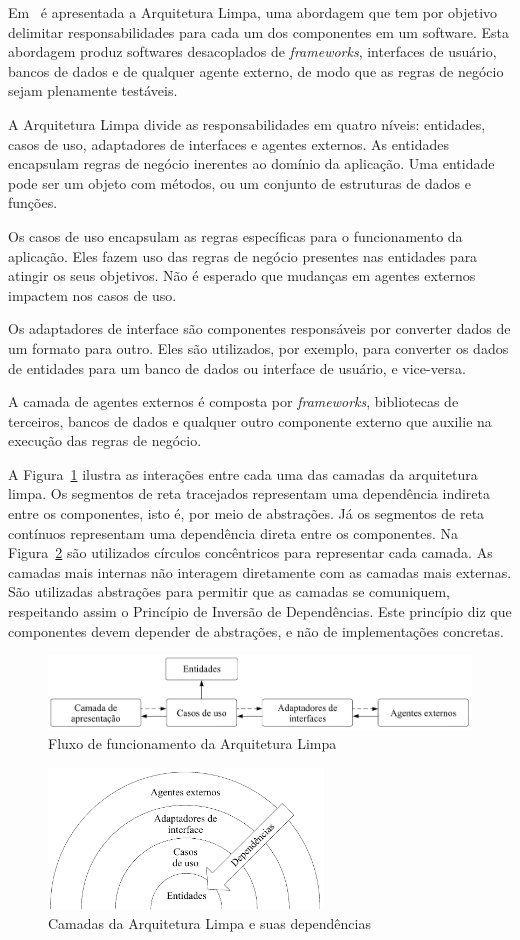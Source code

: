 Em~\cite{clean-arch-book} é apresentada a Arquitetura Limpa, uma abordagem que tem por objetivo delimitar responsabilidades para cada um dos componentes em um software.
Esta abordagem produz softwares desacoplados de \emph{frameworks}, interfaces de usuário, bancos de dados e de qualquer agente externo, de modo que as regras de negócio sejam plenamente testáveis.

A Arquitetura Limpa divide as responsabilidades em quatro níveis: entidades, casos de uso, adaptadores de interfaces e agentes externos.
As entidades encapsulam regras de negócio inerentes ao domínio da aplicação.
Uma entidade pode ser um objeto com métodos, ou um conjunto de estruturas de dados e funções.

Os casos de uso encapsulam as regras específicas para o funcionamento da aplicação.
Eles fazem uso das regras de negócio presentes nas entidades para atingir os seus objetivos.
Não é esperado que mudanças em agentes externos impactem nos casos de uso.

Os adaptadores de interface são componentes responsáveis por converter dados de um formato para outro.
Eles são utilizados, por exemplo, para converter os dados de entidades para um banco de dados ou interface de usuário, e vice-versa.

A camada de agentes externos é composta por \emph{frameworks}, bibliotecas de terceiros, bancos de dados e qualquer outro componente externo que auxilie na execução das regras de negócio.

A Figura~\ref{fig:clean_arch} ilustra as interações entre cada uma das camadas da arquitetura limpa.
Os segmentos de reta tracejados representam uma dependência indireta entre os componentes, isto é, por meio de abstrações.
Já os segmentos de reta contínuos representam uma dependência direta entre os componentes.
Na Figura~\ref{fig:clean_arch_circles} são utilizados círculos concêntricos para representar cada camada.
As camadas mais internas não interagem diretamente com as camadas mais externas.
São utilizadas abstrações para permitir que as camadas se comuniquem, respeitando assim o Princípio de Inversão de Dependências.
Este princípio diz que componentes devem depender de abstrações, e não de implementações concretas.

\begin{figure}[ht]
	\centering
	\includegraphics[width=1\textwidth]{images/clean_arch.png}
	\caption{Fluxo de funcionamento da Arquitetura Limpa}
	\label{fig:clean_arch}
\end{figure}

\begin{figure}[ht]
	\centering
	\includegraphics[width=0.65\textwidth]{images/clean_arch_circles.png}
	\caption{Camadas da Arquitetura Limpa e suas dependências}
	\label{fig:clean_arch_circles}
\end{figure}
